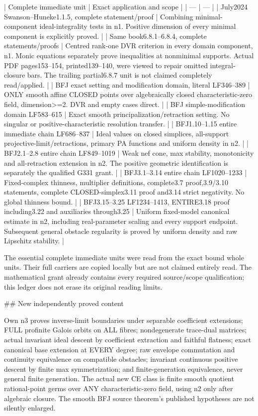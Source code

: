 \documentclass[11pt]{article}
\begin{document}
| Complete immediate unit | Exact application and scope |
| --- | --- |
| July2024 Swanson--Huneke1.1.5, complete statement/proof | Combining minimal-component ideal-integrality tests in n1. Positive dimension of every minimal component is explicitly proved. |
| Same book6.8.1--6.8.4, complete statements/proofs | Centred rank-one DVR criterion in every domain component, n1. Monic equations separately prove inequalities at nonminimal supports. Actual PDF pages153--154, printed139--140, were viewed to repair omitted integral-closure bars. The trailing partial6.8.7 unit is not claimed completely read/applied. |
| BFJ exact setting and modification domain, literal LF346--389 | ONLY smooth affine CLOSED points over algebraically closed characteristic-zero field, dimension\textgreater{}=2. DVR and empty cases direct. |
| BFJ simple-modification domain LF583--615 | Exact smooth principalization/retraction setting. No singular or positive-characteristic resolution transfer. |
| BFJ1.10--1.15 entire immediate chain LF686--837 | Ideal values on closed simplices, all-support projective-limit/retractions, primary PA functions and uniform density in n2. |
| BFJ2.1--2.8 entire chain LF849--1019 | Weak nef cone, max stability, monotonicity and all-retraction extension in n2. The positive geometric identification is separately the qualified G331 grant. |
| BFJ3.1--3.14 entire chain LF1020--1233 | Fixed-complex thinness, multiplier definitions, complete3.7 proof,3.9/3.10 statements, complete CLOSED-simplex3.11 proof and3.14 strict negativity. No global thinness bound. |
| BFJ3.15--3.25 LF1234--1413, ENTIRE3.18 proof including3.22 and auxiliaries through3.25 | Uniform fixed-model canonical estimate in n2, including real-parameter scaling and every support endpoint. Subsequent general obstacle regularity is proved by uniform density and raw Lipschitz stability. |

The essential complete immediate units were read from the exact bound whole units. Their full carriers are copied locally but are not claimed entirely read. The mathematical grant already contains every required source/scope qualification; this ledger does not erase its original reading limits.

\#\# New independently proved content

Own n3 proves inverse-limit boundaries under separable coefficient extensions; FULL profinite Galois orbits on ALL fibres; nondegenerate trace-dual matrices; actual invariant ideal descent by coefficient extraction and faithful flatness; exact canonical base extension at EVERY degree; raw envelope commutation and continuity equivalence on compatible obstacles; invariant continuous positive descent by finite max symmetrization; and finite-generation equivalence, never general finite generation. The actual new CE class is finite smooth quotient rational-point germs over ANY characteristic-zero field, using n2 only after algebraic closure. The smooth BFJ source theorem's published hypotheses are not silently enlarged.
\end{document}
